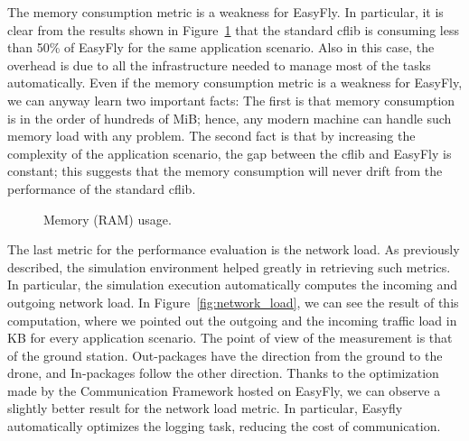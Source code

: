 The memory consumption metric is a weakness for EasyFly. 
In particular, it is clear from the results shown in Figure~\ref{fig:ram_usage} that the standard cflib is consuming less than 50\% of EasyFly for the same application scenario.
Also in this case, the overhead is due to all the infrastructure needed to manage most of the tasks automatically.
Even if the memory consumption metric is a weakness for EasyFly, we can anyway learn two important facts:
The first is that memory consumption is in the order of hundreds of MiB; hence, any modern machine can handle such memory load with any problem.
The second fact is that by increasing the complexity of the application scenario, the gap between the cflib and EasyFly is constant; 
this suggests that the memory consumption will never drift from the performance of the standard cflib.

\begin{figure}[tb]
    \centering
    \quad
    \quad
    \quad
    \caption{Memory (RAM) usage.}\label{fig:ram_usage}
\end{figure}


The last metric for the performance evaluation is the network load. As previously described, the simulation environment helped greatly in retrieving such metrics. 
In particular, the simulation execution automatically computes the incoming and outgoing network load. 
In Figure~\ref{fig:network_load}, we can see the result of this computation, where we pointed out the outgoing and the incoming traffic load in KB for every application scenario.
The point of view of the measurement is that of the ground station. Out-packages have the direction from the ground to the drone, and In-packages follow the other direction. 
Thanks to the optimization made by the Communication Framework hosted on EasyFly, we can observe a slightly better result for the network load metric.
In particular, Easyfly automatically optimizes the logging task, reducing the cost of communication.

